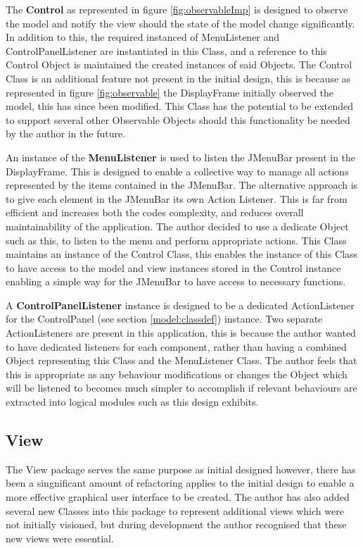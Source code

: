The \textbf{Control} as represented in figure \ref{fig:observableImp} is designed to observe the model and notify the view should the state of the model change significantly. In addition to this, the required instanced of MenuListener and ControlPanelListener are instantiated in this Class, and a reference to this Control Object is maintained the created instances of said Objects. The Control Class is an additional feature not present in the initial design, this is because as represented in figure \ref{fig:observable} the DisplayFrame initially observed the model, this has since been modified. This Class has the potential to be extended to support several other Observable Objects should this functionality be needed by the author in the future.

An instance of the \textbf{MenuListener} is used to listen the JMenuBar present in the DisplayFrame. This is designed to enable a collective way to manage all actions represented by the items contained in the JMenuBar. The alternative approach is to give each element in the JMenuBar its own Action Listener. This is far from efficient and increases both the codes complexity, and reduces overall maintainability of the application. The author decided to use a dedicate Object such as this, to listen to the menu and perform appropriate actions. This Class maintains an instance of the Control Class, this enables the instance of this Class to have access to the model and view instances stored in the Control instance enabling a simple way for the JMenuBar to have access to necessary functions.

A \textbf{ControlPanelListener} instance is designed to be a dedicated ActionListener for the ControlPanel (see section \ref{model:classdef}) instance. Two separate ActionListeners are present in this application, this is because the author wanted to have dedicated listeners for each component, rather than having a combined Object representing this Class and the MenuListener Class. The author feels that this is appropriate as any behaviour modifications or changes the Object which will be listened to becomes much simpler to accomplish if relevant behaviours are extracted into logical modules such as this design exhibits.


\subsection{View}

The View package serves the same purpose as initial designed however, there has been a singnificant amount of refactoring applies to the initial design to enable a more effective graphical user interface to be created. The author has also added several new Classes into this package to represent additional views which were not initially visioned, but during development the author recognised that these new views were essential.

